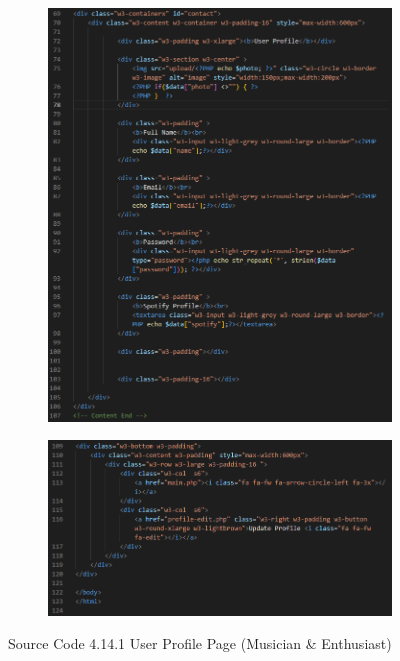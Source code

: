 \begin{enumerate}[1.]
    \clearpage
    \begin{figure}[h]\ContinuedFloat
        \centering
        \begin{subfigure}[b]{0.7\textwidth}
            \centering
            \includegraphics[width=\textwidth]{mainmatter/images/frontend/code/userprofile.png}
            \label{fig:sub1}
        \end{subfigure}
        \hspace{0.05\textwidth}
        \begin{subfigure}[b]{0.7\textwidth}
            \centering
            \includegraphics[width=\textwidth]{mainmatter/images/frontend/code/userprofile2.png}
            \label{fig:sub2}
        \end{subfigure}
        \caption*{Source Code 4.14.1 User Profile Page (Musician \& Enthusiast)}
        \label{fig:myfig53a}
    \end{figure}
    \clearpage


\end{enumerate}
